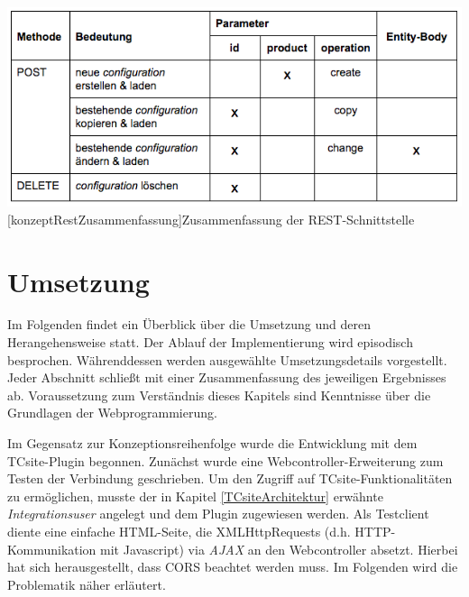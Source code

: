 \documentclass[11pt, a4paper, titlepage, listof=totoc, bibliography=totoc, index=totoc, twoside, openright, headings=normal, draft]{scrreprt}
\begin{document}
\vspace{1em}
\begin{minipage}{\linewidth}
	\centering
	\includegraphics[width=1\linewidth]{Abbildungen/konzeptRestZusammenfassung.png}
	[konzeptRestZusammenfassung]{Zusammenfassung der REST-Schnittstelle}
	\label{fig:konzeptRestZusammenfassung}
\end{minipage}
\vspace{1em}

\pagebreak

\section{Umsetzung}
\label{section:Umsetzung}
Im Folgenden findet ein Überblick über die Umsetzung und deren Herangehensweise statt. Der Ablauf der Implementierung wird episodisch besprochen. Währenddessen werden ausgewählte Umsetzungsdetails vorgestellt. Jeder Abschnitt schließt mit einer Zusammenfassung des jeweiligen Ergebnisses ab. Voraussetzung zum Verständnis dieses Kapitels sind Kenntnisse über die Grundlagen der Webprogrammierung.

Im Gegensatz zur Konzeptionsreihenfolge wurde die Entwicklung mit dem TCsite-Plugin begonnen. Zunächst wurde eine Webcontroller-Erweiterung zum Testen der Verbindung geschrieben. Um den Zugriff auf TCsite-Funktionalitäten zu ermöglichen, musste der in Kapitel \ref{TCsiteArchitektur} erwähnte \emph{Integrationsuser} angelegt und dem Plugin zugewiesen werden. Als Testclient diente eine einfache HTML-Seite, die XMLHttpRequests (d.h. HTTP-Kommunikation mit Javascript) via  \emph{AJAX} an den Webcontroller absetzt. Hierbei hat sich herausgestellt, dass  \ac{CORS} beachtet werden muss. Im Folgenden wird die Problematik näher erläutert.
\end{document}
